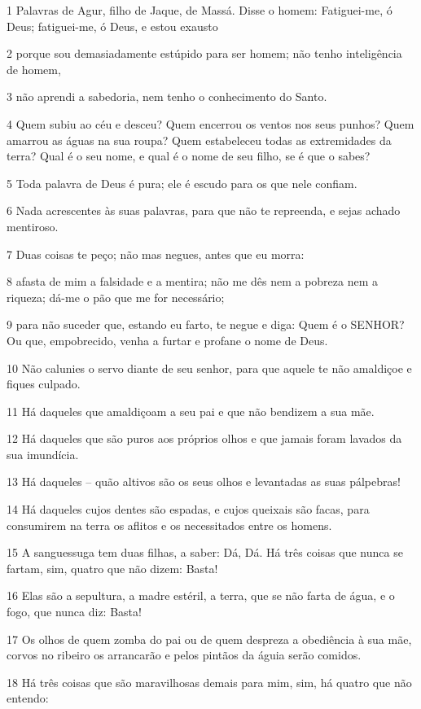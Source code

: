 \par 1 Palavras de Agur, filho de Jaque, de Massá. Disse o homem: Fatiguei-me, ó Deus; fatiguei-me, ó Deus, e estou exausto
\par 2 porque sou demasiadamente estúpido para ser homem; não tenho inteligência de homem,
\par 3 não aprendi a sabedoria, nem tenho o conhecimento do Santo.
\par 4 Quem subiu ao céu e desceu? Quem encerrou os ventos nos seus punhos? Quem amarrou as águas na sua roupa? Quem estabeleceu todas as extremidades da terra? Qual é o seu nome, e qual é o nome de seu filho, se é que o sabes?
\par 5 Toda palavra de Deus é pura; ele é escudo para os que nele confiam.
\par 6 Nada acrescentes às suas palavras, para que não te repreenda, e sejas achado mentiroso.
\par 7 Duas coisas te peço; não mas negues, antes que eu morra:
\par 8 afasta de mim a falsidade e a mentira; não me dês nem a pobreza nem a riqueza; dá-me o pão que me for necessário;
\par 9 para não suceder que, estando eu farto, te negue e diga: Quem é o SENHOR? Ou que, empobrecido, venha a furtar e profane o nome de Deus.
\par 10 Não calunies o servo diante de seu senhor, para que aquele te não amaldiçoe e fiques culpado.
\par 11 Há daqueles que amaldiçoam a seu pai e que não bendizem a sua mãe.
\par 12 Há daqueles que são puros aos próprios olhos e que jamais foram lavados da sua imundícia.
\par 13 Há daqueles -- quão altivos são os seus olhos e levantadas as suas pálpebras!
\par 14 Há daqueles cujos dentes são espadas, e cujos queixais são facas, para consumirem na terra os aflitos e os necessitados entre os homens.
\par 15 A sanguessuga tem duas filhas, a saber: Dá, Dá. Há três coisas que nunca se fartam, sim, quatro que não dizem: Basta!
\par 16 Elas são a sepultura, a madre estéril, a terra, que se não farta de água, e o fogo, que nunca diz: Basta!
\par 17 Os olhos de quem zomba do pai ou de quem despreza a obediência à sua mãe, corvos no ribeiro os arrancarão e pelos pintãos da águia serão comidos.
\par 18 Há três coisas que são maravilhosas demais para mim, sim, há quatro que não entendo:
